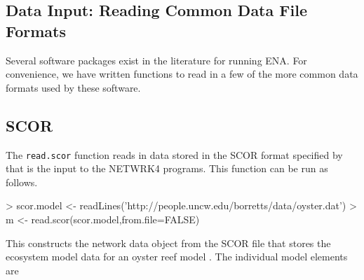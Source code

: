 \documentclass[article]{jss}
\begin{document}




\subsection{Data Input: Reading Common Data File Formats}
Several software packages exist in the literature for running ENA.  For
convenience, we have written functions to read in a few of the more
common data formats used by these software.

\subsection*{SCOR}
The \texttt{read.scor} function reads in data stored in the SCOR
format specified by \citet{ulanowicz91} that is the input to the
NETWRK4 programs.  This function can be run as follows.

\begin{Schunk}
\begin{Sinput}
> scor.model <- readLines('http://people.uncw.edu/borretts/data/oyster.dat')
> m <- read.scor(scor.model,from.file=FALSE)
\end{Sinput}
\end{Schunk}

This constructs the network data object from the SCOR file that stores
the ecosystem model data for an oyster reef model \citep{dame81}.  The
individual model elements are
\end{document}
